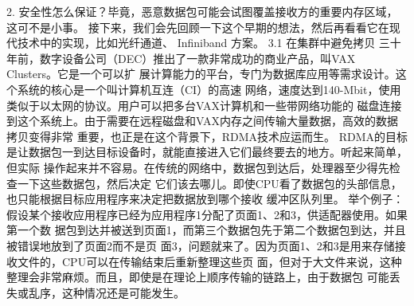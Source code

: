  2. 安全性怎么保证？毕竟，恶意数据包可能会试图覆盖接收方的重要内存区域，这可不是小事。
    接下来，我们会先回顾一下这个早期的想法，然后再看看它在现代技术中的实现，比如光纤通道、
    Infiniband 方案。
3.1 在集群中避免拷贝
三十年前，数字设备公司（DEC）推出了一款非常成功的商业产品，叫VAX Clusters。它是一个可以扩
展计算能力的平台，专门为数据库应用等需求设计。这个系统的核心是一个叫计算机互连（CI）的高速
网络，速度达到140-Mbit，使用类似于以太网的协议。用户可以把多台VAX计算机和一些带网络功能的
磁盘连接到这个系统上。由于需要在远程磁盘和VAX内存之间传输大量数据，高效的数据拷贝变得非常
重要，也正是在这个背景下，RDMA技术应运而生。
RDMA的目标是让数据包一到达目标设备时，就能直接进入它们最终要去的地方。听起来简单，但实际
操作起来并不容易。在传统的网络中，数据包到达后，处理器至少得先检查一下这些数据包，然后决定
它们该去哪儿。即使CPU看了数据包的头部信息，也只能根据目标应用程序来决定把数据放到哪个接收
缓冲区队列里。
举个例子：假设某个接收应用程序已经为应用程序1分配了页面1、2和3，供适配器使用。如果第一个数
据包到达并被送到页面1，而第三个数据包先于第二个数据包到达，并且被错误地放到了页面2而不是页
面3，问题就来了。因为页面1、2和3是用来存储接收文件的，CPU可以在传输结束后重新整理这些页
面，但对于大文件来说，这种整理会非常麻烦。而且，即使是在理论上顺序传输的链路上，由于数据包
可能丢失或乱序，这种情况还是可能发生。




